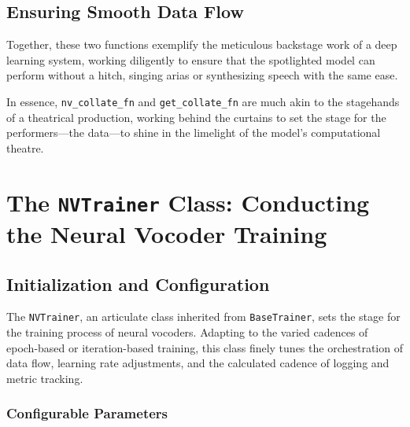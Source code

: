 \documentclass[a4paper]{article}
\begin{document}
\subsection{Ensuring Smooth Data Flow}

Together, these two functions exemplify the meticulous backstage work of a deep learning system, working diligently to ensure that the spotlighted model can perform without a hitch, singing arias or synthesizing speech with the same ease.


In essence, \texttt{nv\_collate\_fn} and \texttt{get\_collate\_fn} are much akin to the stagehands of a theatrical production, working behind the curtains to set the stage for the performers—the data—to shine in the limelight of the model's computational theatre.



\section{The \texttt{NVTrainer} Class: Conducting the Neural Vocoder Training}

\subsection{Initialization and Configuration}

The \texttt{NVTrainer}, an articulate class inherited from \texttt{BaseTrainer}, sets the stage for the training process of neural vocoders. Adapting to the varied cadences of epoch-based or iteration-based training, this class finely tunes the orchestration of data flow, learning rate adjustments, and the calculated cadence of logging and metric tracking.

\subsubsection{Configurable Parameters}
\end{document}
